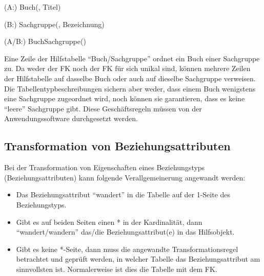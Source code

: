           \begin{center}
          \end{center}
          \begin{small}
            (A:) Buch(, Titel)

            (B:) Sachgruppe(, Bezeichnung)

            (A/B:) BuchSachgruppe()
          \end{small}
          
          Eine Zeile der Hilfstabelle \enquote{Buch/Sachgruppe} ordnet ein Buch
          einer Sachgruppe zu. Da weder der FK  noch der FK
           f\"ur sich unikal sind, k\"onnen mehrere Zeilen
          der Hilfstabelle auf dasselbe Buch oder auch auf dieselbe Sachgruppe
          verweisen. Die Tabellentypbeschreibungen sichern aber weder, dass
          einem Buch wenigstens eine Sachgruppe zugeordnet wird, noch k\"onnen
          sie garantieren, dass es keine \enquote{leere} Sachgruppe gibt. Diese
          Gesch\"aftsregeln m\"ussen von der Anwendungssoftware durchgesetzt
          werden.
      \subsection{Transformation von Beziehungsattributen}
        Bei der Transformation von Eigenschaften eines Beziehungstyps (Beziehungsattributen) kann folgende Verallgemeinerung angewandt werden:
        \begin{itemize}
          \item Das Beziehungsattribut \enquote{wandert} in die Tabelle auf der 1-Seite des Beziehungstyps.
          \item Gibt es auf beiden Seiten einen * in der Kardinalit\"at, dann \enquote{wandert/wandern} das/die Beziehungsattribut(e) in das Hilfsobjekt.
          \item Gibt es keine *-Seite, dann muss die angewandte Transformationsregel betrachtet und gepr\"uft werden, in welcher Tabelle das Beziehungsattribut am sinnvollsten ist. Normalerweise ist dies die Tabelle mit dem FK.
        \end{itemize}
